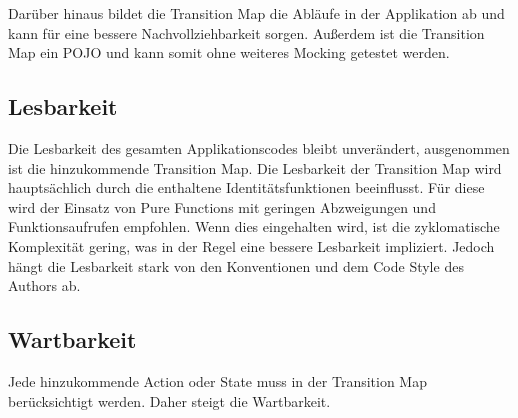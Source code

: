 Darüber hinaus bildet die Transition Map die Abläufe in der Applikation ab und kann für eine bessere Nachvollziehbarkeit sorgen. Außerdem ist die Transition Map ein POJO und kann somit ohne weiteres Mocking getestet werden.

\subsection{Lesbarkeit}
Die Lesbarkeit des gesamten Applikationscodes bleibt unverändert, ausgenommen ist die hinzukommende Transition Map. Die Lesbarkeit der Transition Map wird hauptsächlich durch die enthaltene Identitätsfunktionen beeinflusst. Für diese wird der Einsatz von Pure Functions mit geringen Abzweigungen und Funktionsaufrufen empfohlen. Wenn dies eingehalten wird, ist die zyklomatische Komplexität gering, was in der Regel eine bessere Lesbarkeit impliziert. Jedoch hängt die Lesbarkeit stark von den Konventionen und dem Code Style des Authors ab.

\subsection{Wartbarkeit}
Jede hinzukommende Action oder State muss in der Transition Map berücksichtigt werden. Daher steigt die Wartbarkeit.

